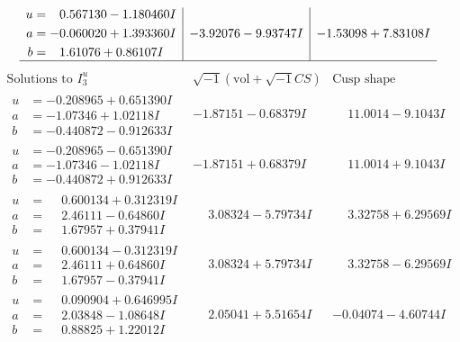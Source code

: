\documentclass[1p]{elsarticle_modified}
\theoremstyle{definition}
\newcommand{\I}{\sqrt{-1}}
\begin{document}
$$\begin{array}{c|c|c}
\begin{aligned}
u &= \phantom{-}0.567130 - 1.180460 I \\
a &= -0.060020 + 1.393360 I \\
b &= \phantom{-}1.61076 + 0.86107 I\end{aligned}
 & -3.92076 - 9.93747 I & -1.53098 + 7.83108 I\\
 \hline 
 \end{array}$$\newpage$$\begin{array}{c|c|c}  
\text{Solutions to }I^u_{3}& \I (\text{vol} + \sqrt{-1}CS) & \text{Cusp shape}\\
 \hline 
\begin{aligned}
u &= -0.208965 + 0.651390 I \\
a &= -1.07346 + 1.02118 I \\
b &= -0.440872 - 0.912633 I\end{aligned}
 & -1.87151 - 0.68379 I & \phantom{-}11.0014 - 9.1043 I \\ \hline\begin{aligned}
u &= -0.208965 - 0.651390 I \\
a &= -1.07346 - 1.02118 I \\
b &= -0.440872 + 0.912633 I\end{aligned}
 & -1.87151 + 0.68379 I & \phantom{-}11.0014 + 9.1043 I \\ \hline\begin{aligned}
u &= \phantom{-}0.600134 + 0.312319 I \\
a &= \phantom{-}2.46111 - 0.64860 I \\
b &= \phantom{-}1.67957 + 0.37941 I\end{aligned}
 & \phantom{-}3.08324 - 5.79734 I & \phantom{-}3.32758 + 6.29569 I \\ \hline\begin{aligned}
u &= \phantom{-}0.600134 - 0.312319 I \\
a &= \phantom{-}2.46111 + 0.64860 I \\
b &= \phantom{-}1.67957 - 0.37941 I\end{aligned}
 & \phantom{-}3.08324 + 5.79734 I & \phantom{-}3.32758 - 6.29569 I \\ \hline\begin{aligned}
u &= \phantom{-}0.090904 + 0.646995 I \\
a &= \phantom{-}2.03848 - 1.08648 I \\
b &= \phantom{-}0.88825 + 1.22012 I\end{aligned}
 & \phantom{-}2.05041 + 5.51654 I & -0.04074 - 4.60744 I \\ \hline\begin{aligned}

\end{aligned}
\end{array}$$
\end{document}
